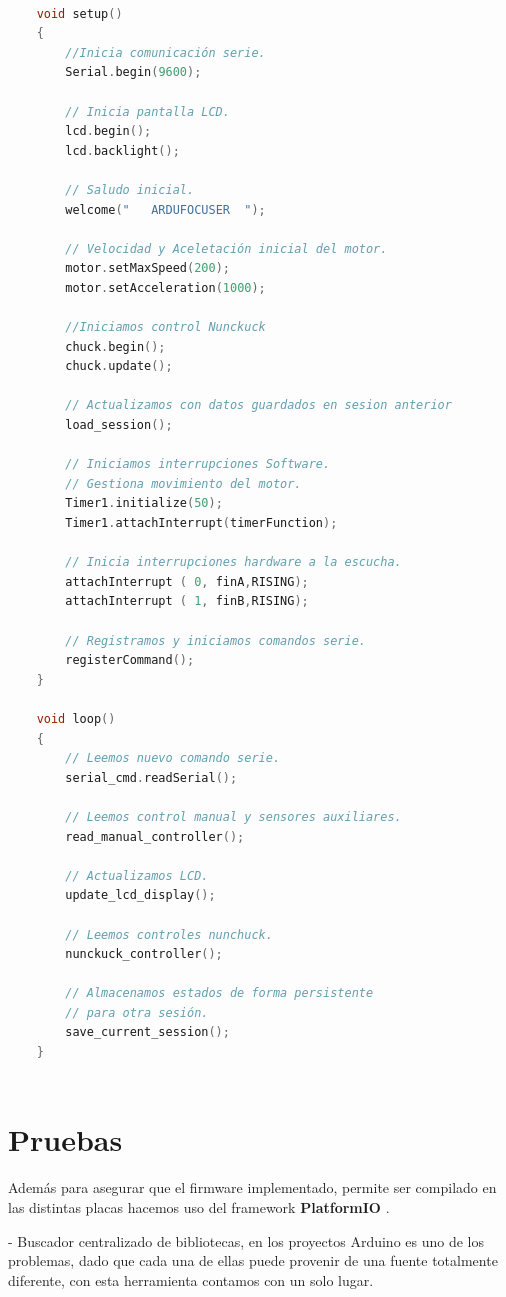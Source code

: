\begin{lstlisting}[language=C, caption={Núcleo implementación firmware  ardufocuser},label={lst:nucleo_firmware_ardufocuser }]

	void setup()
	{
		//Inicia comunicación serie.
		Serial.begin(9600);
		
		// Inicia pantalla LCD.
		lcd.begin();
		lcd.backlight();
		
		// Saludo inicial.
		welcome("   ARDUFOCUSER  ");
		
		// Velocidad y Aceletación inicial del motor.
		motor.setMaxSpeed(200);
		motor.setAcceleration(1000);
		
		//Iniciamos control Nunckuck
		chuck.begin();
		chuck.update();
		
		// Actualizamos con datos guardados en sesion anterior
		load_session();
		
		// Iniciamos interrupciones Software.
		// Gestiona movimiento del motor.
		Timer1.initialize(50);
		Timer1.attachInterrupt(timerFunction);
		
		// Inicia interrupciones hardware a la escucha.
		attachInterrupt ( 0, finA,RISING);
		attachInterrupt ( 1, finB,RISING);
		
		// Registramos y iniciamos comandos serie.
		registerCommand();
	}
	
	void loop()
	{
		// Leemos nuevo comando serie.
		serial_cmd.readSerial();
		
		// Leemos control manual y sensores auxiliares.
		read_manual_controller();
		
		// Actualizamos LCD.
		update_lcd_display();
		
		// Leemos controles nunchuck.
		nunckuck_controller();
		
		// Almacenamos estados de forma persistente 
		// para otra sesión.
		save_current_session();
	}



\end{lstlisting}


\section{Pruebas}

Además para asegurar que el firmware implementado, permite ser compilado en las distintas placas hacemos uso del framework   \textbf{PlatformIO} \cite{patform}.


- Buscador centralizado de bibliotecas, en los proyectos Arduino es uno de los problemas, dado que cada una de ellas puede provenir de una fuente totalmente diferente, con esta herramienta contamos con un solo lugar.

